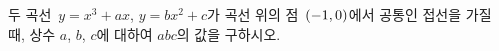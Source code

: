 두 곡선~$y=x^3+ax$, $y=bx^2+c$가 곡선 위의 점~$(-1{,}\mkern3mu\mathopen{}0)$에서 공통인 접선을 가질 때, 상수 $a$, $b$, $c$에 대하여 $abc$의 값을 구하시오.
